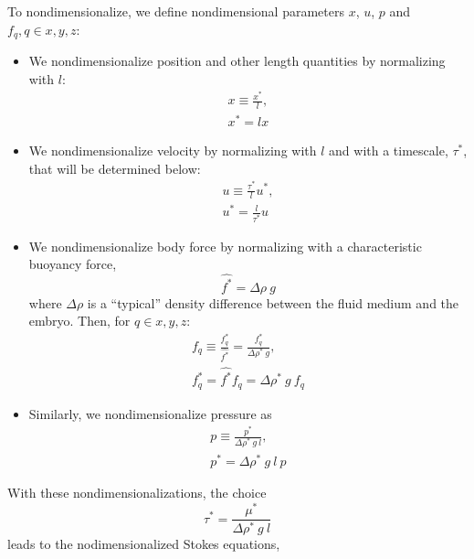 \documentclass[10pt,a4paper]{article}
\def\l{\mathit{l}}
\begin{document}
To nondimensionalize, we define nondimensional parameters $x$, $u$, $p$ and $f_q, q \in x, y, z$:
\begin{itemize}
	\item We nondimensionalize position and other length quantities by normalizing with $l$:
	\begin{eqnarray*}
		x \equiv \frac{x^*}{\mathit{l}} , \\
		x^* = \mathit{l} x 
	\end{eqnarray*} 
	\item We nondimensionalize velocity by normalizing with $l$ and with a timescale, $\tau^*$, that will be determined below:
	\begin{eqnarray*}\label{uscale}
		u \equiv \frac{\tau^*}{l} u^* , \\
		u^* = \frac{\mathit{l}}{\tau^*} u 
	\end{eqnarray*} 
	\item We nondimensionalize body force by normalizing with a characteristic buoyancy force,
	\begin{equation}\label{charforce}
		\hat{f^*} = \Delta \rho ~ g
	\end{equation}
	where $\Delta \rho$ is a ``typical'' density difference between the fluid medium and the embryo. 
	Then, for $q \in x, y, z$:
	\begin{eqnarray*}
		f_q \equiv \frac{f_q^*}{\hat{f^*}}  = \frac{f_q^*}{\Delta \rho^* ~ g} , \\
		f_q^* = \hat{f^*} f_q = \Delta \rho^* ~ g ~ f_q
	\end{eqnarray*} 
	\item Similarly, we nondimensionalize pressure as
	\begin{eqnarray*}
		p \equiv  \frac{ p^*}{\Delta \rho^* ~ g ~ l} , \\
		p^* = \Delta \rho^* ~ g ~ l ~ p  
	\end{eqnarray*} 
\end{itemize}
With these nondimensionalizations, the choice 
\begin{equation}\label{tau_def}
	\tau^* = \frac{\mu^*}{\Delta \rho^* ~ g ~ l}
\end{equation}
leads to the nodimensionalized Stokes equations,
\end{document}
